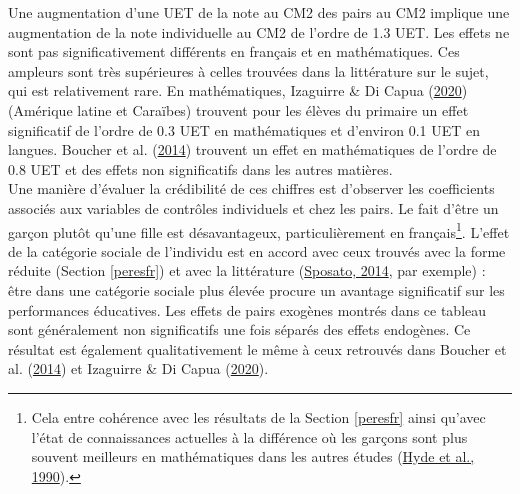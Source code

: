 \documentclass[
]{book}
\begin{document}
\quad Une augmentation d'une UET de la note au CM2 des pairs au CM2 implique une augmentation de la note individuelle au CM2 de l'ordre de 1.3 UET. Les effets ne sont pas significativement différents en français et en mathématiques. Ces ampleurs sont très supérieures à celles trouvées dans la littérature sur le sujet, qui est relativement rare. En mathématiques, Izaguirre \& Di Capua (\protect\hyperlink{ref-IZA:DIC:20}{2020}) (Amérique latine et Caraïbes) trouvent pour les élèves du primaire un effet significatif de l'ordre de 0.3 UET en mathématiques et d'environ 0.1 UET en langues. Boucher et al. (\protect\hyperlink{ref-BOU:eal:14}{2014}) trouvent un effet en mathématiques de l'ordre de 0.8 UET et des effets non significatifs dans les autres matières.\\
Une manière d'évaluer la crédibilité de ces chiffres est d'observer les coefficients associés aux variables de contrôles individuels et chez les pairs. Le fait d'être un garçon plutôt qu'une fille est désavantageux, particulièrement en français\footnote{Cela entre cohérence avec les résultats de la Section \ref{peresfr} ainsi qu'avec l'état de connaissances actuelles à la différence où les garçons sont plus souvent meilleurs en mathématiques dans les autres études (\protect\hyperlink{ref-HYD:eal:90}{Hyde et al., 1990}).}. L'effet de la catégorie sociale de l'individu est en accord avec ceux trouvés avec la forme réduite (Section \ref{peresfr}) et avec la littérature (\protect\hyperlink{ref-SPO:14}{Sposato, 2014}, par exemple) : être dans une catégorie sociale plus élevée procure un avantage significatif sur les performances éducatives. Les effets de pairs exogènes montrés dans ce tableau sont généralement non significatifs une fois séparés des effets endogènes. Ce résultat est également qualitativement le même à ceux retrouvés dans Boucher et al. (\protect\hyperlink{ref-BOU:eal:14}{2014}) et Izaguirre \& Di Capua (\protect\hyperlink{ref-IZA:DIC:20}{2020}).

\newpage  
\begingroup\fontsize{6}{8}\selectfont
\end{document}
